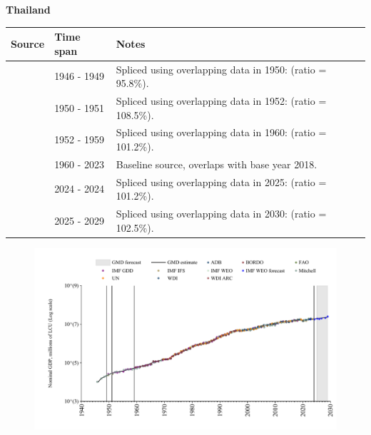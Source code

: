 \documentclass[12pt,a4paper,landscape]{article}
\begin{document}
\begin{adjustbox}{max totalsize={\paperwidth}{\paperheight},center}
\begin{minipage}[t][\textheight][t]{\textwidth}
\vspace*{0.5cm}
{}
\begin{center}
{\Large\bfseries Thailand}
\end{center}
\vspace{0.5cm}
\begin{table}[H]
\centering
\small
\begin{tabular}{|l|l|l|}
\hline
\textbf{Source} & \textbf{Time span} & \textbf{Notes} \\
\hline
\rowcolor{white}\cite{Mitchell}& 1946 - 1949 &Spliced using overlapping data in 1950: (ratio = 95.8\%).\\
\rowcolor{lightgray}\cite{IMF_IFS}& 1950 - 1951 &Spliced using overlapping data in 1952: (ratio = 108.5\%).\\
\rowcolor{white}\cite{IMF_GDD}& 1952 - 1959 &Spliced using overlapping data in 1960: (ratio = 101.2\%).\\
\rowcolor{lightgray}\cite{WDI}& 1960 - 2023 &Baseline source, overlaps with base year 2018.\\
\rowcolor{white}\cite{IMF_IFS}& 2024 - 2024 &Spliced using overlapping data in 2025: (ratio = 101.2\%).\\
\rowcolor{lightgray}\cite{IMF_WEO_forecast}& 2025 - 2029 &Spliced using overlapping data in 2030: (ratio = 102.5\%).\\
\hline
\end{tabular}
\end{table}
\begin{figure}[H]
\centering
\includegraphics[width=\textwidth,height=0.6\textheight,keepaspectratio]{graphs/THA_nGDP.pdf}
\end{figure}
\end{minipage}
\end{adjustbox}
\end{document}
